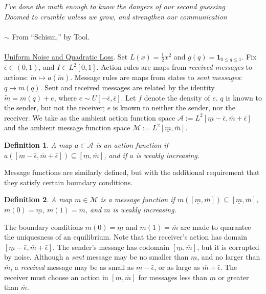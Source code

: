 \documentclass[12pt]{article}
\newtheorem{definition}{Definition}
\begin{document}
\noindent\textit{I've done the math enough to know the dangers of our second guessing\\ Doomed to crumble unless we grow, and strengthen our communication}\\ \\$\sim$ From ``Schism,'' by Tool. \\ \\
\noindent\underline{Uniform Noise and Quadratic Loss}. Set $L(x)=\frac{1}{2}x^2$ and $g(q)=\mathbf{1}_{0\leq q\leq1}$. Fix $\bar{\epsilon}\in(0,1)$, and $I\in L^{2}[0,1]$. Action rules are maps from \textit{received messages} to actions: $\tilde{m}\mapsto a(\tilde{m})$. Message rules are maps from states to \textit{sent messages}: $q\mapsto m(q)$. Sent and received messages are related by the identity $\tilde{m}=m(q)+e$, where $e\sim U[-\bar{\epsilon},\bar{\epsilon}]$. Let $f$ denote the density of $e$. $q$ is known to the sender, but not the receiver; $e$ is known to neither the sender, nor the receiver. We take as the ambient action function space $\mathcal{A}:=L^{2}[\underline{m}-\bar{\epsilon},\overline{m}+\bar{\epsilon}]$ and the ambient message function space $\mathcal{M}:=L^{2}[\underline{m},\overline{m}]$.
\begin{definition}
A map $a\in \mathcal{A}$ is an action function if $a([\underline{m}-\bar{\epsilon},\overline{m}+\bar{\epsilon}])\subseteq[\underline{m},\overline{m}]$, and if $a$ is weakly increasing.  
\end{definition}
\noindent Message functions are similarly defined, but with the additional requirement that they satisfy certain boundary conditions.
\begin{definition}
A map $m\in \mathcal{M}$ is a message function if $m([\underline{m},\overline{m}])\subseteq[\underline{m},\overline{m}]$, $m(0)=\underline{m}$, $m(1)=\overline{m}$, and $m$ is weakly increasing. 
\end{definition}
\noindent The boundary conditions $m(0)=\underline{m}$ and $m(1)=\overline{m}$ are made to quarantee the uniquesness of an equilibrium. Note that the receiver's action has domain $[\underline{m}-\bar{\epsilon},\overline{m}+\bar{\epsilon}]$. The sender's message has codomain $[\underline{m},\overline{m}]$, but it is corrupted by noise. Although a \textit{sent} message may be no smaller than $\underline{m}$, and no larger than $\overline{m}$, a \textit{received} message may be as small as $\underline{m}-\bar{\epsilon}$, or as large as $\overline{m}+\bar{\epsilon}$. The receiver must choose an action in $[\underline{m},\overline{m}]$ for messages less than $\underline{m}$ or greater than $\overline{m}$.\\
\end{document}
